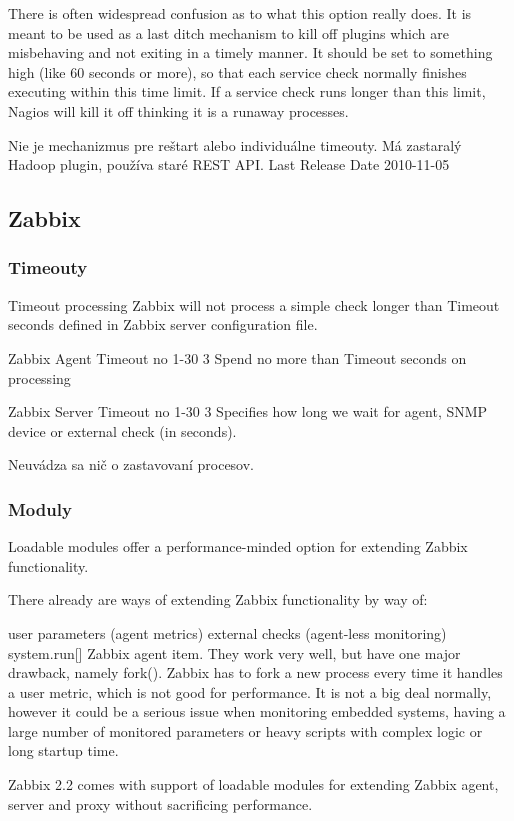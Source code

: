 \documentclass[11pt,final,oneside]{fithesis}
\begin{document}
There is often widespread confusion as to what this option really does. It is meant to be used as a last ditch mechanism to kill off plugins which are misbehaving and not exiting in a timely manner. It should be set to something high (like 60 seconds or more), so that each service check normally finishes executing within this time limit. If a service check runs longer than this limit, Nagios will kill it off thinking it is a runaway processes.
\cite{02}


Nie je mechanizmus pre reštart alebo individuálne timeouty.
Má zastaralý Hadoop plugin, používa staré REST API.
Last Release Date 2010-11-05
\cite{03}

\subsection{Zabbix}
\subsubsection{Timeouty}
Timeout processing
Zabbix will not process a simple check longer than Timeout seconds defined in Zabbix server configuration file.
\cite{04}

Zabbix Agent
Timeout	 no	 1-30	3	Spend no more than Timeout seconds on processing
\cite{20}

Zabbix Server
Timeout	 no	 1-30	3	Specifies how long we wait for agent, SNMP device or external check (in seconds).
\cite{05}

Neuvádza sa nič o zastavovaní procesov.
\subsubsection{Moduly}

Loadable modules offer a performance-minded option for extending Zabbix functionality.

There already are ways of extending Zabbix functionality by way of:

user parameters (agent metrics)
external checks (agent-less monitoring)
system.run[] Zabbix agent item.
They work very well, but have one major drawback, namely fork(). Zabbix has to fork a new process every time it handles a user metric, which is not good for performance. It is not a big deal normally, however it could be a serious issue when monitoring embedded systems, having a large number of monitored parameters or heavy scripts with complex logic or long startup time.

Zabbix 2.2 comes with support of loadable modules for extending Zabbix agent, server and proxy without sacrificing performance.
\end{document}
